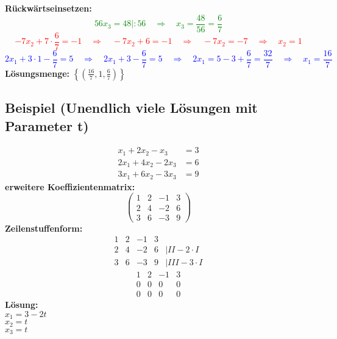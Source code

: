 \documentclass[12pt,a4paper]{article}
\begin{document}
\textbf{Rückwärtseinsetzen:} \\
\textcolor{green}{
\[
    56x_3 = 48 \vert :56
    \quad \Rightarrow \quad
    x_3 = \frac{48}{56} = \frac{6}{7} 
\]
}
\textcolor{red}{
\[
-7x_2 + 7 \cdot \frac{6}{7} = -1 \quad \Rightarrow \quad -7x_2 + 6 = -1 \quad \Rightarrow \quad -7x_2 = -7 \quad \Rightarrow \quad x_2 = 1
\]
}
\textcolor{blue}{
\[
2x_1 + 3 \cdot 1 - \frac{6}{7} = 5 \quad \Rightarrow \quad 2x_1 + 3 - \frac{6}{7} = 5 \quad \Rightarrow \quad 2x_1 = 5 - 3 + \frac{6}{7} = \frac{32}{7} \quad \Rightarrow \quad x_1 = \frac{16}{7}
\]
}
\textbf{Lösungsmenge:} $\left\{ \left( \frac{16}{7}, 1, \frac{6}{7} \right) \right\}$

\subsection{Beispiel (Unendlich viele Lösungen mit Parameter t)}
\begin{align*}
    x_1 + 2x_2 - x_3 &= 3 \\
    2x_1 + 4x_2 - 2x_3 &= 6 \\
    3x_1 + 6x_2 - 3x_3 &= 9
\end{align*}
\textbf{erweitere Koeffizientenmatrix:}
\[
\begin{pmatrix}
1 & 2 & -1 & 3 \\
2 & 4 & -2 & 6 \\
3 & 6 & -3 & 9
\end{pmatrix}
\]
\textbf{Zeilenstuffenform:}
\[
\begin{matrix}
1 & 2 & -1 & 3 \\
2 & 4 & -2 & 6 & \vert II - 2 \cdot I\\
3 & 6 & -3 & 9 & \vert III - 3 \cdot I
\end{matrix}
\]
\[
\begin{matrix}
1 & 2 & -1 & 3 \\
0 & 0 & 0 & 0 \\
0 & 0 & 0 & 0
\end{matrix}
\]
\textbf{Lösung:} \\
 $x_1 = 3 - 2t$ \\
$x_2 = t$ \\
$x_3 = t$
\end{document}
